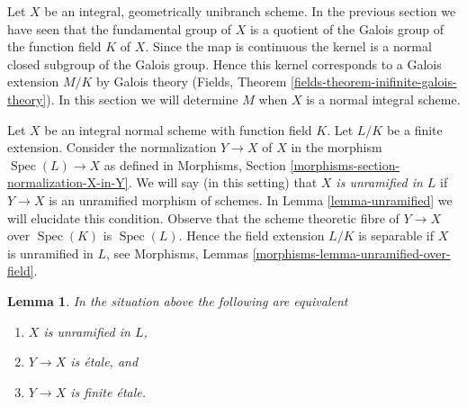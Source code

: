 \documentclass{stacks-project}
\theoremstyle{plain}
\newtheorem{lemma}[subsection]{Lemma}
\theoremstyle{definition}
\theoremstyle{remark}
\numberwithin{equation}{subsection}
\def\Spec{\mathop{\mathrm{Spec}}}
\begin{document}
\noindent
Let $X$ be an integral, geometrically unibranch scheme. In the previous section
we have seen that the fundamental group of $X$ is a quotient of the
Galois group of the function field $K$ of $X$. Since the map is continuous
the kernel is a normal closed subgroup of the Galois group. Hence this kernel
corresponds to a Galois extension $M/K$ by Galois theory
(Fields, Theorem \ref{fields-theorem-inifinite-galois-theory}).
In this section we will determine $M$ when $X$ is a normal integral scheme.

\medskip\noindent
Let $X$ be an integral normal scheme with function field $K$.
Let $L/K$ be a finite extension. Consider the normalization
$Y \to X$ of $X$ in the morphism $\Spec(L) \to X$ as defined in
Morphisms, Section \ref{morphisms-section-normalization-X-in-Y}.
We will say (in this setting) that {\it $X$ is unramified in $L$}
if $Y \to X$ is an unramified morphism of schemes. In
Lemma \ref{lemma-unramified} we will elucidate this condition.
Observe that the scheme theoretic fibre of $Y \to X$ over $\Spec(K)$
is $\Spec(L)$. Hence the field extension $L/K$ is separable if $X$ is
unramified in $L$, see
Morphisms, Lemmas \ref{morphisms-lemma-unramified-over-field}.

\begin{lemma}
\label{lemma-unramified-in-L}
In the situation above the following are equivalent
\begin{enumerate}
\item $X$ is unramified in $L$,
\item $Y \to X$ is \'etale, and
\item $Y \to X$ is finite \'etale.
\end{enumerate}
\end{lemma}
\end{document}
